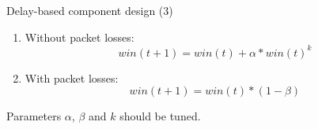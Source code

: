 \begin{frame}{Delay-based component design (3)}
	\begin{enumerate}
		\item Without packet losses:
			$$
				win (t+1) = win(t) + \alpha*win(t)^k
			$$
		\item With packet losses:
			$$
				win (t+1) = win(t) * (1 - \beta)
			$$
	\end{enumerate}
	Parameters $\alpha$, $\beta$ and $k$ should be tuned.
\end{frame}

